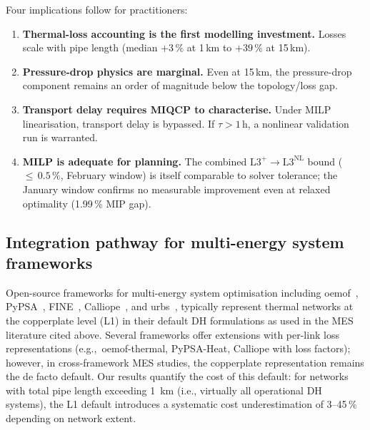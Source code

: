 \documentclass[a4paper,fleqn]{cas-dc}
\newcommand{\Lplus}{\mathrm{L3}^{+}}
\newcommand{\Lnl}{\mathrm{L3}^{\mathrm{NL}}}
\begin{document}
Four implications follow for practitioners:
%
\begin{enumerate}[nosep]
  \item \textbf{Thermal-loss accounting is the first modelling
        investment.} Losses scale with pipe length (median
        $+3\,\%$ at 1\,km to $+39\,\%$ at 15\,km).
  \item \textbf{Pressure-drop physics are marginal.} Even at
        15\,km, the pressure-drop component remains an order of
        magnitude below the topology/loss gap.
  \item \textbf{Transport delay requires MIQCP to characterise.}
        Under MILP linearisation, transport delay is bypassed. If
        $\tau > 1$\,h, a nonlinear validation run is warranted.
  \item \textbf{MILP is adequate for planning.} The combined
        $\Lplus\!\to\!\Lnl$ bound (${\leq}\,0.5\,\%$, February
        window) is itself comparable to solver tolerance; the
        January window confirms no measurable improvement even at
        relaxed optimality (1.99\,\% MIP gap).
\end{enumerate}

\subsection{Integration pathway for multi-energy system frameworks}
\label{sec:disc_tools}

Open-source frameworks for multi-energy system optimisation 
including oemof~\cite{Hilpert2018_oemof},
PyPSA~\cite{Brown2018_pypsa}, FINE~\cite{Welder2018_FINE},
Calliope~\cite{Pfenninger2018_calliope}, and
urbs~\cite{Dorfner2016_urbs}, typically represent thermal
networks at the copperplate level (L1) in their default
DH formulations as used in the MES literature cited above.
Several frameworks offer extensions with per-link loss
representations (e.g.,\ oemof-thermal, PyPSA-Heat, Calliope with loss factors); however, in
cross-framework MES studies, the copperplate representation
remains the de facto default. Our results quantify the cost of
this default: for networks with total pipe length exceeding
\SI{1}{\kilo\metre} (i.e., virtually all operational DH systems),
the L1 default introduces a systematic cost underestimation of
3--45\,\% depending on network extent.
\end{document}

